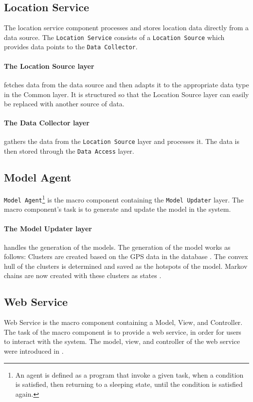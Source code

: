 \subsection{Location Service} 
The location service component processes and stores location data directly from a data source. 
The \texttt{Location Service} consists of a \texttt{Location Source} which provides data points to the \texttt{Data Collector}.

\paragraph{The Location Source layer} fetches data from the data source and then adapts it to the appropriate data type in the Common layer.
It is structured so that the Location Source layer can easily be replaced with another source of data.

\paragraph{The Data Collector layer} gathers the data from the \texttt{Location Source} layer and processes it. 
The data is then stored through the \texttt{Data Access} layer.

\subsection{Model Agent}
\texttt{Model Agent}\footnote{An agent is defined as a program that invoke a given task, when a condition is satisfied, then returning to a sleeping state, until the condition is satisfied again.\cite{definitionagent}} is the macro component containing the \texttt{Model Updater} layer.
The macro component's task is to generate and update the model in the system. 

\paragraph{The Model Updater layer} handles the generation of the models.
The generation of the model works as follows:
Clusters are created based on the GPS data in the database .
The convex hull of the clusters is determined and saved as the hotspots of the model.
Markov chains are now created with these clusters as states .

\subsection{Web Service}\label{arch:webservice}
Web Service is the macro component containing a Model, View, and Controller.
The task of the macro component is to provide a web service, in order for users to interact with the system.
The model, view, and controller of the web service were introduced in .
